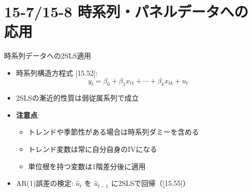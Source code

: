 \documentclass[
  ignorenonframetext,
]{beamer}
\providecommand{\tightlist}{%
  \setlength{\itemsep}{0pt}\setlength{\parskip}{0pt}}
\begin{document}
\section{15-7/15-8
時系列・パネルデータへの応用}\label{ux6642ux7cfbux5217ux30d1ux30cdux30ebux30c7ux30fcux30bfux3078ux306eux5fdcux7528}

\begin{frame}{時系列データへの2SLS適用}
\label{ux6642ux7cfbux5217ux30c7ux30fcux30bfux3078ux306e2slsux9069ux7528}
\begin{itemize}
\tightlist
\item
  時系列構造方程式 {[}15.52{]}:
  \[y_t = \beta_0 + \beta_1 x_{t1} + \cdots + \beta_k x_{tk} + u_t\]
\item
  2SLSの漸近的性質は弱従属系列で成立
\item
  \textbf{注意点}:

  \begin{itemize}
  \tightlist
  \item
    トレンドや季節性がある場合は時系列ダミーを含める
  \item
    トレンド変数は常に自分自身のIVになる
  \item
    単位根を持つ変数は1階差分後に適用
  \end{itemize}
\item
  AR(1)誤差の検定: \(\hat{u}_t\) を \(\hat{u}_{t-1}\)
  に2SLSで回帰（{[}15.55{]}）
\end{itemize}
\end{frame}
\end{document}
